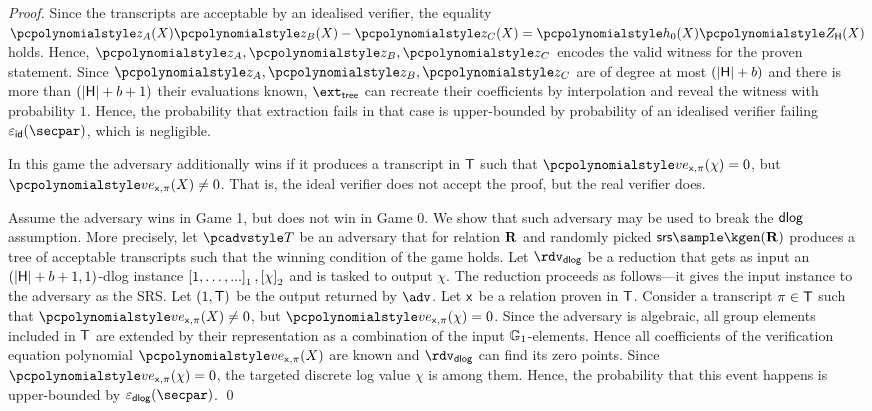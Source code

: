 \documentclass[runningheads,11pt]{llncs}
\begin{document}
\begin{proof}
  Since the transcripts are acceptable by an idealised verifier, the equality
  $\p{z_A} (X) \p{z_B} (X) - \p{z_C} (X) = \p{h_0} (X) \ZERO_\HHH (X)$
  holds. Hence, $\p{z_A}, \p{z_B}, \p{z_C}$ encodes the valid witness for the
  proven statement. Since $\p{z_A}, \p{z_B}, \p{z_C}$ are of degree at most
  $(|\mathsf{H}| + b)$ and there is more than $(|\mathsf{H}| + b + 1)$ their evaluations
  known, $\extt$ can recreate their coefficients by interpolation and reveal the
  witness with probability $1$. Hence, the probability that extraction fails in
  that case is upper-bounded by probability of an idealised verifier failing
  $\epsid(\secpar)$, which is negligible.

   In this game the adversary additionally wins if it produces a
  transcript in $\mathsf{T}$ such that $\vereq_{\inp, \zkproof}(\chi) = 0$, but
  $\vereq_{\inp, \zkproof}(X) \neq 0$. That is, the ideal verifier does not
  accept the proof, but the real verifier does.

   Assume the adversary wins in Game 1, but
  does not win in Game 0. We show that such adversary may be used to break the
  $\mathsf{dlog}$ assumption. More precisely, let $\tdv$ be an adversary that for
  relation $\mathbf{R}$ and randomly picked $\srs \sample \kgen(\REL)$ produces a tree
  of acceptable transcripts such that the winning condition of the game
  holds. Let $\rdvdlog$ be a reduction that gets as input an
  $(|\mathsf{H}| + b + 1, 1)$-dlog instance $\left[1, \ldots, ...\right]_{1}, \left[\chi\right]_{2}$ and
  is tasked to output $\chi$. The reduction proceeds as follows---it gives the
  input instance to the adversary as the SRS. Let $(1, \mathsf{T})$ be the output
  returned by $\adv$. Let $\mathsf{x}$ be a relation proven in $\mathsf{T}$.  Consider a
  transcript $\pi \in \mathsf{T}$ such that $\vereq_{\inp, \zkproof}(X) \neq 0$,
  but $\vereq_{\inp, \zkproof}(\chi) = 0$. Since the adversary is algebraic, all
  group elements included in $\mathsf{T}$ are extended by their representation as a
  combination of the input $\mathbb{G}_1$-elements. Hence all coefficients of the
  verification equation polynomial $\vereq_{\inp, \zkproof}(X)$ are known and
  $\rdvdlog$ can find its zero points. Since
  $\vereq_{\inp, \zkproof}(\chi) = 0$, the targeted discrete log value $\chi$ is
  among them.  Hence, the probability that this event happens is upper-bounded
  by $\epsdlog(\secpar)$. \qed

\end{proof}
\end{document}

